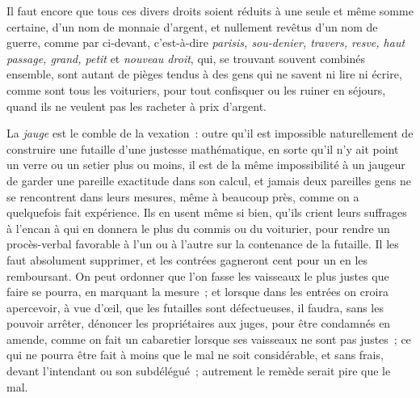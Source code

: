 \documentclass[french,twoside]{book} %
\begin{document}
Il faut encore que tous ces divers droits soient réduits à une seule et même somme certaine, d’un nom de monnaie d’argent, et nullement revêtus d’un nom de guerre, comme par ci-devant, c’est-à-dire {\itshape parisis, sou-denier, travers, resve, haut passage, grand, petit} et {\itshape nouveau droit}, qui, se trouvant souvent combinés ensemble, sont autant de pièges tendus à des gens qui ne savent ni lire ni écrire, comme sont tous les voituriers, pour tout confisquer ou les ruiner en séjours, quand ils ne veulent pas les racheter à prix d’argent.\par
La {\itshape jauge} est le comble de la vexation : outre qu’il est impossible naturellement de construire une futaille d’une justesse mathématique, en sorte qu’il n’y ait point un verre ou un setier plus ou moins, il est de la même impossibilité à un jaugeur de garder une pareille exactitude dans son calcul, et jamais deux pareilles gens ne se rencontrent dans leurs mesures, même à beaucoup près, comme on a quelquefois fait expérience. Ils en usent même si bien, qu’ils crient leurs suffrages à l’encan à qui en donnera le plus du commis ou du voiturier, pour rendre un procès-verbal favorable à l’un ou à l’autre sur la contenance de la futaille. Il les faut absolument supprimer, et les contrées gagneront cent pour un en les remboursant. On peut ordonner que l’on fasse les vaisseaux le plus justes que faire se pourra, en marquant la mesure ; et lorsque dans les entrées on croira apercevoir, à vue d’œil, que les futailles sont défectueuses, il faudra, sans les pouvoir arrêter, dénoncer les propriétaires aux juges, pour être condamnés en amende, comme on fait un cabaretier lorsque ses vaisseaux ne sont pas justes ; ce qui ne pourra être fait à moins que le mal ne soit considérable, et sans frais, devant l’intendant ou son subdélégué ; autrement le remède serait pire que le mal.\par
\end{document}
